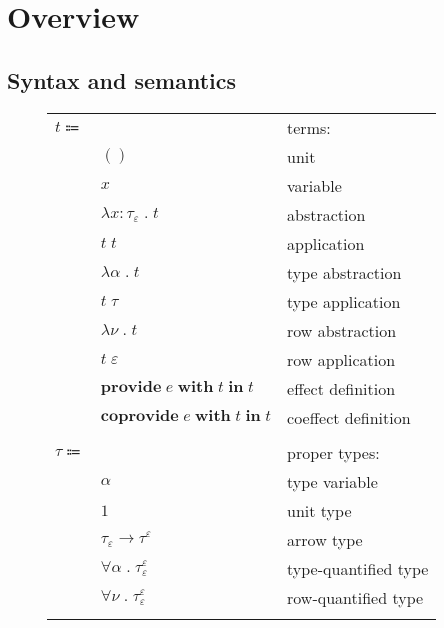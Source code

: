 \documentclass[12pt]{article}
\newcommand\anno[2]{#1 : #2}
\newcommand\term{t}
\newcommand\eunit{()}
\newcommand\evar{x}
\newcommand\eabs[2]{\lambda #1 \; . \; #2}
\newcommand\eapp[2]{#1 \; #2}
\newcommand\etabs[2]{\lambda #1 \; . \; #2}
\newcommand\etapp[2]{#1 \; #2}
\newcommand\eprovide[3]{\textbf{provide} \; #1 \; \textbf{with} \; #2 \; \textbf{in} \; #3}
\newcommand\ecoprovide[3]{\textbf{coprovide} \; #1 \; \textbf{with} \; #2 \; \textbf{in} \; #3}
\newcommand\tembellished[3]{{#1}^{#2}_{#3}}
\newcommand\proper{\tau}
\newcommand\tvar{\alpha}
\newcommand\tunit{1}
\newcommand\tarrow[2]{#1 \rightarrow #2}
\newcommand\tforall[2]{\forall #1 \; . \; #2}
\newcommand\row{\varepsilon}
\newcommand\rvar{\nu}
\newcommand\effect{e}
\begin{document}
  \section{Overview}

    \subsection{Syntax and semantics}

      \begin{figure}[H]
        \begin{mdframed}[backgroundcolor=none]
          \begin{center}
            \begin{tabular}{l l l}
              $\term \Coloneqq $ & & terms: \\
              & $\eunit$ & unit \\
              & $\evar$ & variable \\
              & $\eabs{\anno{\evar}{\tembellished{\proper}{}{\row}}}{\term}$ & abstraction \\
              & $\eapp{\term}{\term}$ & application \\
              & $\etabs{\tvar}{\term}$ & type abstraction \\
              & $\etapp{\term}{\proper}$ & type application \\
              & $\etabs{\rvar}{\term}$ & row abstraction \\
              & $\etapp{\term}{\row}$ & row application \\
              & $\eprovide{\effect}{\term}{\term}$ & effect definition \\
              & $\ecoprovide{\effect}{\term}{\term}$ & coeffect definition \\
              \\
              $\proper \Coloneqq$ & & proper types: \\
              & $\tvar$ & type variable \\
              & $\tunit$ & unit type \\
              & $\tarrow{\tembellished{\proper}{}{\row}}{\tembellished{\proper}{\row}{}}$ & arrow type \\
              & $\tforall{\tvar}{\tembellished{\proper}{\row}{\row}}$ & type-quantified type \\
              & $\tforall{\rvar}{\tembellished{\proper}{\row}{\row}}$ & row-quantified type \\
              \\

\end{tabular}
\end{center}
\end{mdframed}
\end{figure}
\end{document}
